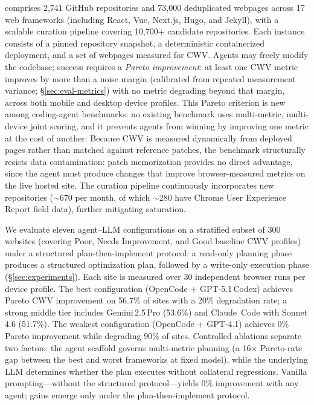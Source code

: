 \OurBench comprises 2{,}741 GitHub repositories and 73{,}000 deduplicated webpages across 17 web frameworks (including React, Vue, Next.js, Hugo, and Jekyll), with a scalable curation pipeline covering 10{,}700+ candidate repositories. Each instance consists of a pinned repository snapshot, a deterministic containerized deployment, and a set of webpages measured for CWV. Agents may freely modify the codebase; success requires a \emph{Pareto improvement}: at least one CWV metric improves by more than a noise margin (calibrated from repeated measurement variance; \S\ref{sec:eval-metrics}) with no metric degrading beyond that margin, across both mobile and desktop device profiles. This Pareto criterion is new among coding-agent benchmarks: no existing benchmark uses multi-metric, multi-device joint scoring, and it prevents agents from winning by improving one metric at the cost of another. Because CWV is measured dynamically from deployed pages rather than matched against reference patches, the benchmark structurally resists data contamination: patch memorization provides no direct advantage, since the agent must produce changes that improve browser-measured metrics on the live hosted site. The curation pipeline continuously incorporates new repositories ($\sim$670 per month, of which $\sim$280 have Chrome User Experience Report field data), further mitigating saturation.

We evaluate eleven agent--LLM configurations on a stratified subset of 300 websites (covering Poor, Needs Improvement, and Good baseline CWV profiles) under a structured plan-then-implement protocol: a read-only planning phase produces a structured optimization plan, followed by a write-only execution phase (\S\ref{sec:experiments}). Each site is measured over 30 independent browser runs per device profile. The best configuration (OpenCode + GPT-5.1\,Codex) achieves Pareto CWV improvement on 56.7\% of sites with a 20\% degradation rate; a strong middle tier includes Gemini\,2.5\,Pro (53.6\%) and Claude~Code with Sonnet\,4.6 (51.7\%). The weakest configuration (OpenCode + GPT-4.1) achieves 0\% Pareto improvement while degrading 90\% of sites. Controlled ablations separate two factors: the agent scaffold governs multi-metric planning (a 16$\times$ Pareto-rate gap between the best and worst frameworks at fixed model), while the underlying LLM determines whether the plan executes without collateral regressions. Vanilla prompting---without the structured protocol---yields 0\% improvement with any agent; gains emerge only under the plan-then-implement protocol.

